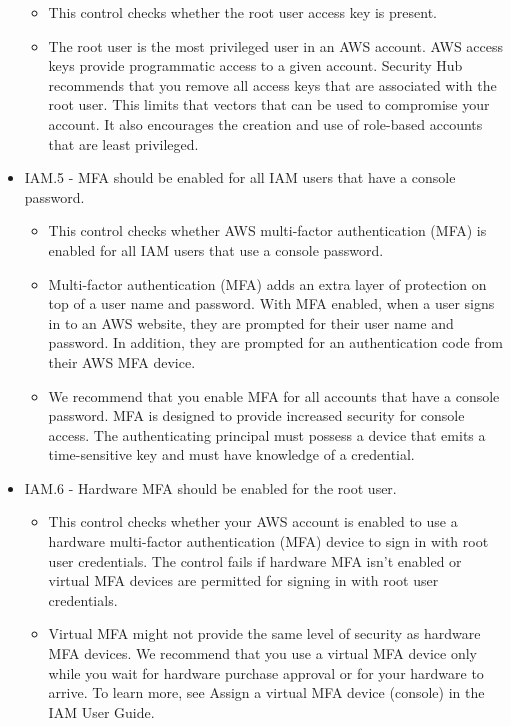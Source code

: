 \begin{mdframed}[backgroundcolor=gray!05, linecolor=gray!50]
\begin{itemize}
    \begin{itemize}
        \item This control checks whether the root user access key is present.
        \item The root user is the most privileged user in an AWS account. AWS access keys provide programmatic access to a given account. Security Hub recommends that you remove all access keys that are associated with the root user. This limits that vectors that can be used to compromise your account. It also encourages the creation and use of role-based accounts that are least privileged.
    \end{itemize}
    \item IAM.5 - MFA should be enabled for all IAM users that have a console password.
    \begin{itemize}
        \item This control checks whether AWS multi-factor authentication (MFA) is enabled for all IAM users that use a console password.
        \item Multi-factor authentication (MFA) adds an extra layer of protection on top of a user name and password. With MFA enabled, when a user signs in to an AWS website, they are prompted for their user name and password. In addition, they are prompted for an authentication code from their AWS MFA device. 
        \item We recommend that you enable MFA for all accounts that have a console password. MFA is designed to provide increased security for console access. The authenticating principal must possess a device that emits a time-sensitive key and must have knowledge of a credential.
    \end{itemize}
    \item IAM.6 - Hardware MFA should be enabled for the root user.
    \begin{itemize}
        \item This control checks whether your AWS account is enabled to use a hardware multi-factor authentication (MFA) device to sign in with root user credentials. The control fails if hardware MFA isn't enabled or virtual MFA devices are permitted for signing in with root user credentials.
        \item Virtual MFA might not provide the same level of security as hardware MFA devices. We recommend that you use a virtual MFA device only while you wait for hardware purchase approval or for your hardware to arrive. To learn more, see Assign a virtual MFA device (console) in the IAM User Guide.

\end{itemize}
\end{itemize}
\end{mdframed}
